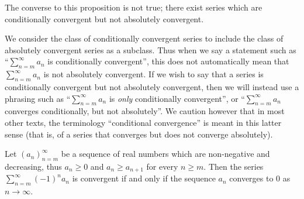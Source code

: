 \begin{remark}\label{7.2.10}
  The converse to this proposition is not true;
  there exist series which are conditionally convergent but not absolutely convergent.
\end{remark}

\begin{remark}\label{7.2.11}
  We consider the class of conditionally convergent series to include the class of absolutely convergent series as a subclass.
  Thus when we say a statement such as ``\(\sum_{n = m}^\infty a_n\) is conditionally convergent'', this does not automatically mean that \(\sum_{n = m}^\infty a_n\) is not absolutely convergent.
  If we wish to say that a series is conditionally convergent but not absolutely convergent, then we will instead use a phrasing such as ``\(\sum_{n = m}^\infty a_n\) is \emph{only} conditionally convergent'', or ``\(\sum_{n = m}^\infty a_n\) converges conditionally, but not absolutely''.
  We caution however that in most other texts, the terminology ``conditional convergence'' is meant in this latter sense
  (that is, of a series that converges but does not converge absolutely).
\end{remark}

\begin{proposition}\label{7.2.12}
  Let \((a_n)_{n = m}^\infty\) be a sequence of real numbers which are non-negative and decreasing, thus \(a_n \geq 0\) and \(a_n \geq a_{n + 1}\) for every \(n \geq m\).
  Then the series \(\sum_{n = m}^\infty (-1)^n a_n\) is convergent if and only if the sequence \(a_n\) converges to \(0\) as \(n \to \infty\).
\end{proposition}

